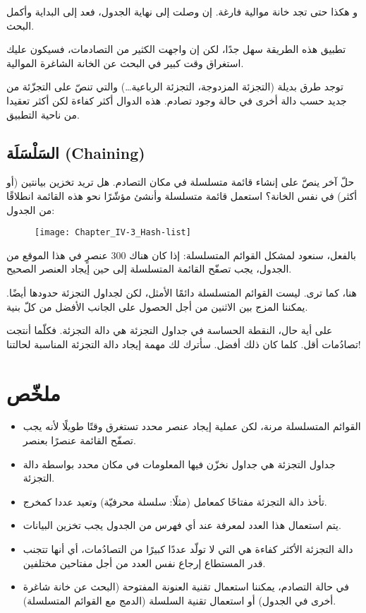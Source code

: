 و هكذا حتى تجد خانة موالية فارغة. إن وصلت إلى نهاية الجدول، فعد إلى البداية وأكمل البحث.

تطبيق هذه الطريقة سهل جدًا، لكن إن واجهت الكثير من التصادمات، فسيكون عليك استغراق وقت كبير في البحث عن الخانة الشاغرة الموالية.

توجد طرق بديلة (التجزئة المزدوجة، التجزئة الرباعية\dots) والتي تنصّ على التجزّئة من جديد حسب دالة أخرى في حالة وجود تصادم. هذه الدوال أكثر كفاءة لكن أكثر تعقيدا من ناحية التطبيق.

\subsection{السَلْسَلَة (\textenglish{Chaining})}

حلّ آخر ينصّ على إنشاء قائمة متسلسلة في مكان التصادم. هل تريد تخزين بيانتين (أو أكثر) في نفس الخانة؟ استعمل قائمة متسلسلة وأنشئ مؤشّرًا نحو هذه القائمة انطلاقًا من الجدول:

\begin{figure}[H]
	\centering
	\texttt{[image: Chapter\_IV-3\_Hash-list]}
\end{figure}

بالفعل، سنعود لمشكل القوائم المتسلسلة: إذا كان هناك 300 عنصرٍ في هذا الموقع من الجدول، يجب تصفّح القائمة المتسلسلة إلى حين إيجاد العنصر الصحيح.

هنا، كما ترى. ليست القوائم المتسلسلة دائمًا الأمثل، لكن لجداول التجزئة حدودها أيضًا. يمكننا المزج بين الاثنين من أجل الحصول على الجانب الأفضل من كلّ بنية.

على أية حال، النقطة الحساسة في جداول التجزئة هي دالة التجزئة. فكلّما أنتجت تصادُمات أقل. كلما كان ذلك أفضل.
سأترك لك مهمة إيجاد دالة التجزئة المناسبة لحالتنا!

\section*{ملخّص}

\begin{itemize}
	\item القوائم المتسلسلة مرنة، لكن عملية إيجاد عنصر محدد تستغرق وقتًا طويلًا لأنه يجب تصفّح القائمة عنصرًا بعنصر.
	\item جداول التجزئة هي جداول نخزّن فيها المعلومات في مكان محدد بواسطة دالة التجزئة.
	\item تأخذ دالة التجزئة مفتاحًا كمعامل (مثلًا: سلسلة محرفيّة) وتعيد عددا كمخرج.
	\item يتم استعمال هذا العدد لمعرفة عند أي فهرس من الجدول يجب تخزين البيانات.
	\item دالة التجزئة الأكثر كفاءة هي التي لا تولّد عددًا كبيرًا من التصادُمات، أي أنها تتجنب قدر المستطاع إرجاع نفس العدد من أجل مفتاحين مختلفين.
	\item في حالة التصادم، يمكننا استعمال تقنية العنونة المفتوحة (البحث عن خانة شاغرة أخرى في الجدول) أو استعمال تقنية السلسلة (الدمج مع القوائم المتسلسلة).
\end{itemize}
